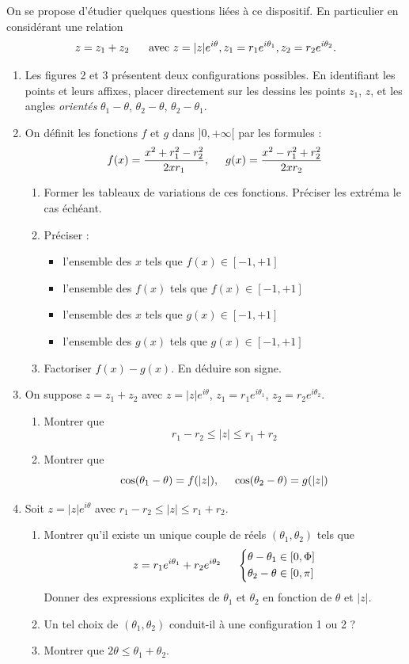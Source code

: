 On se propose d'étudier quelques questions liées à ce dispositif. En particulier en considérant une relation
\[
z=z_1 + z_2\hspace{0.5cm}
\text{ avec } z=|z|e^{i\theta},z_1=r_1e^{i\theta_1},z_2=r_2e^{i\theta_2}. 
\]
\begin{enumerate}
\item Les figures 2 et 3 présentent deux configurations possibles. En identifiant les points et leurs affixes, placer directement sur les dessins les points $z_1$, $z$, et les angles \emph{orientés} $\theta_1 - \theta$, $\theta_2 - \theta$, $\theta_2 - \theta_1$.
\item On définit les fonctions $f$ et $g$ dans $]0,+\infty[$ par les formules :
\[
f(x)=\frac{x^2+r_1^{2}-r_2^2}{2xr_1},\hspace{0.5cm} g(x)=\frac{x^2-r_1^{2}+r_2^2}{2xr_2}
\]
\begin{enumerate}
\item Former les tableaux de variations de ces fonctions. Préciser les extréma le cas échéant.
\item Préciser : \begin{itemize}
\item l'ensemble des $x$ tels que $f(x)\in [-1,+1]$
\item l'ensemble des $f(x)$ tels que $f(x)\in [-1,+1]$
\item l'ensemble des $x$ tels que $g(x)\in [-1,+1]$
\item l'ensemble des $g(x)$ tels que $g(x)\in [-1,+1]$
\end{itemize}
\item Factoriser $f(x) - g(x)$. En déduire son signe.
\end{enumerate}
\item On suppose $z=z_1 + z_2$ avec $z=|z|e^{i\theta}$, $z_1=r_1e^{i\theta_1}$, $z_2=r_2e^{i\theta_2}$.
\begin{enumerate}
\item Montrer que
\[r_1 - r_2 \leq |z| \leq r_1 +r_2\]
\item Montrer que 
\[
\cos(\theta_1-\theta)=f(|z|), \hspace{0.5cm} \cos(\theta_2-\theta)=g(|z|)\\
\]
\end{enumerate}
\item Soit $z=|z|e^{i\theta}$ avec $r_1 - r_2 \leq |z| \leq r_1 +r_2$.
\begin{enumerate}
\item 
 Montrer qu'il existe un unique couple de réels $(\theta_1,\theta_2)$ tels que
\[
z = r_1e^{i\theta_1} + r_2e^{i\theta_2}  \hspace{0.5cm}
\left\lbrace 
\begin{aligned}
\theta - \theta_1 &\in [0,\Phi] \\
\theta_2 - \theta &\in [0,\pi] 
\end{aligned}
\right. 
\]
Donner des expressions explicites de $\theta_1$ et $\theta_2$ en fonction de $\theta$ et $|z|$.
\item Un tel choix de $(\theta_1,\theta_2)$ conduit-il à une configuration 1 ou 2 ?
\item Montrer que $2\theta \leq \theta_1 +\theta_2$. 
\end{enumerate}


\end{enumerate}
